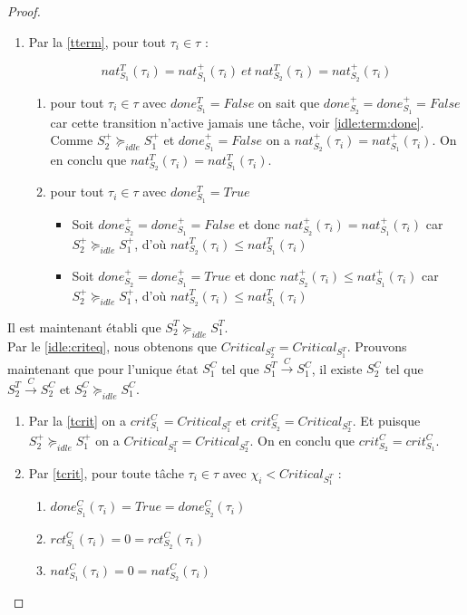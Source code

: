 \documentclass[11pt,a4paper,oneside]{book}
\theoremstyle{break}
\theoremstyle{breakplain}
\begin{document}
\begin{proof}
\begin{enumerate}
\item Par la \autoref{tterm}, pour tout $\tau_i \in \tau$ :

\begin{equation}
nat_{S_1}^T(\tau_i) = nat_{S_1}^+(\tau_i)\ et\ nat_{S_2}^T(\tau_i) = nat_{S_2}^+(\tau_i)
\end{equation}

\begin{enumerate}
\item pour tout $\tau_i \in \tau$ avec $done_{S_1}^T = False$ on sait que $done_{S_2}^+ = done_{S_1}^+ = False$ car cette transition n'active jamais une tâche, voir \autoref{idle:term:done}. Comme $S^+_2 \succeq_{idle} S^+_1$ et $done_{S_1}^+ = False$ on a $nat_{S_2}^+(\tau_i)= nat_{S_1}^+(\tau_i)$. On en conclu que $nat_{S_2}^T(\tau_i) = nat_{S_1}^T(\tau_i)$.

\item pour tout $\tau_i \in \tau$ avec $done_{S_1}^T = True$
\begin{itemize}
\item Soit $done_{S_2}^+ = done_{S_1}^+ = False$ et donc $nat_{S_2}^+(\tau_i)= nat_{S_1}^+(\tau_i)$ car $S^+_2 \succeq_{idle} S^+_1$, d'où $nat_{S_2}^T(\tau_i) \le nat_{S_1}^T(\tau_i)$
\item Soit $done_{S_2}^+ = done_{S_1}^+ = True$ et donc $nat_{S_2}^+(\tau_i)\le nat_{S_1}^+(\tau_i)$ car $S^+_2 \succeq_{idle} S^+_1$, d'où $nat_{S_2}^T(\tau_i) \le nat_{S_1}^T(\tau_i)$
\end{itemize}
\end{enumerate}


\end{enumerate}
Il est maintenant établi que $S^T_2 \succeq_{idle} S^T_1$.\\

Par le \autoref{idle:criteq}, nous obtenons que $Critical_{S_2^T} = Critical_{S_1^T}$. Prouvons maintenant que pour l'unique état $S_1^C$ tel que $S^{T}_1\xrightarrow{C}S^{C}_1$, il existe $S_2^C$ tel que $S^{T}_2\xrightarrow{C}S^{C}_2$ et $S^C_2 \succeq_{idle} S^C_1$.

\begin{enumerate}

\item Par la \autoref{tcrit} on a $crit_{S_1}^C = Critical_{S_1^T}$ et $crit_{S_2}^C = Critical_{S_2^T}$. Et puisque $S^+_2 \succeq_{idle} S^+_1$ on a $Critical_{S_1^T} = Critical_{S_2^T}$. On en conclu que $crit_{S_2}^C= crit_{S_1}^C$.


\item Par \autoref{tcrit}, pour toute tâche $\tau_i \in \tau$ avec $\chi_i < Critical_{S_1^T}$ :
\begin{enumerate}[label=(\alph*)]
\item $done_{S_1}^C(\tau_i) = True = done_{S_2}^C(\tau_i)$
\item $rct_{S_1}^C(\tau_i) = 0 = rct_{S_2}^C(\tau_i)$
\item $nat_{S_1}^C(\tau_i) = 0 = nat_{S_2}^C(\tau_i)$
\end{enumerate}


\end{enumerate}
\end{proof}
\end{document}
